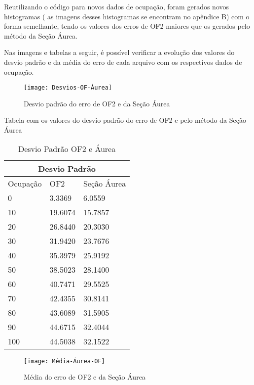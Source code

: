 Reutilizando o código para novos dados de ocupação, foram gerados novos histogramas ( as imagens desses histogramas se encontram no apêndice B) com o forma semelhante, tendo os valores dos erros de OF2 maiores que os gerados pelo método da Seção Áurea.

Nas imagens e tabelas a seguir, é possível verificar a evolução dos valores do desvio padrão e da média do erro de cada arquivo com os respectivos dados de ocupação.

\begin{figure}[H]
    \centering
    \caption{Desvio padrão do erro de OF2 e da Seção Áurea }
    \texttt{[image: Desvios-OF-Áurea]}
    \label{modeloNfce}
\end{figure}

Tabela com os valores do desvio padrão do erro de OF2 e pelo método da Seção Áurea


\begin{table}[htb]
\centering
\ABNTEXfontereduzida
\caption[Desvio Padrão OF2 e Áurea]{Desvio Padrão OF2 e Áurea}
\label{desvio-padrao-aurea}
\begin{tabular}{ |p{3cm}|p{3cm}|p{3cm}|  }
\hline
\multicolumn{3}{|c|}{Desvio Padrão} \\
\hline
Ocupação & OF2 & Seção Áurea\\
\hline
0 & 3.3369 & 6.0559\\
10 &  19.6074 & 15.7857\\
20 &  26.8440 & 20.3030\\
30 &  31.9420 & 23.7676\\
40 &  35.3979 & 25.9192\\
50 &  38.5023 & 28.1400\\
60 &  40.7471 & 29.5525\\
70 &  42.4355 & 30.8141\\
80 &  43.6089 & 31.5905\\
90 &  44.6715 & 32.4044\\
100 &  44.5038 & 32.1522\\
\hline
\end{tabular}
\end{table}
\newline
\newline

\begin{figure}[H]
    \centering
    \caption{Média do erro de OF2 e da Seção Áurea}
    \texttt{[image: Média-Áurea-OF]}
    \label{modeloNfce}
\end{figure}

